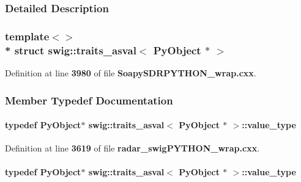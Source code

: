 \subsubsection{Detailed Description}
\subsubsection*{template$<$$>$\\*
struct swig\+::traits\+\_\+asval$<$ Py\+Object $\ast$ $>$}



Definition at line {\bf 3980} of file {\bf Soapy\+S\+D\+R\+P\+Y\+T\+H\+O\+N\+\_\+wrap.\+cxx}.



\subsubsection{Member Typedef Documentation}
\paragraph[{value\+\_\+type}]{\setlength{\rightskip}{0pt plus 5cm}typedef Py\+Object$\ast$ {\bf swig\+::traits\+\_\+asval}$<$ Py\+Object $\ast$ $>$\+::{\bf value\+\_\+type}}\label{structswig_1_1traits__asval_3_01PyObject_01_5_01_4_ad50e5d06c5ffc618c4367791ed2c0aee}


Definition at line {\bf 3619} of file {\bf radar\+\_\+swig\+P\+Y\+T\+H\+O\+N\+\_\+wrap.\+cxx}.

\paragraph[{value\+\_\+type}]{\setlength{\rightskip}{0pt plus 5cm}typedef Py\+Object$\ast$ {\bf swig\+::traits\+\_\+asval}$<$ Py\+Object $\ast$ $>$\+::{\bf value\+\_\+type}}\label{structswig_1_1traits__asval_3_01PyObject_01_5_01_4_ad50e5d06c5ffc618c4367791ed2c0aee}


